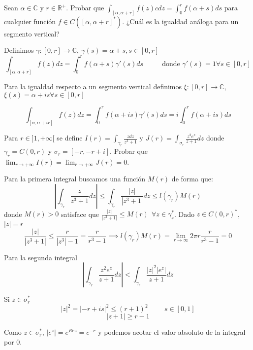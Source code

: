 \begin{ejer}
	Sean $\alpha\in\mathbb{C}$ y $r\in\mathbb{R}^+$. Probar que $\int_{[\alpha,\alpha+r]}f(z)cdz = \int_{0}^{r} f(\alpha +s)ds$ para cualquier función $f\in C([\alpha,\alpha+r]^{\ast})$. ¿Cuál es la igualdad análoga para un segmento vertical?
\end{ejer}

\begin{sol}

Definimos $\gamma :[0,r] \rightarrow \mathbb{C}, \ \gamma (s) = \alpha + s, s\in[0,r]$
$$\int_{[\alpha,\alpha + r]} f(z)dz = \int_{0}^{r} f(\alpha +s)\gamma ' (s)ds \hspace{1cm}\text{ donde }\gamma ' (s) = 1 \forall s\in [0,r]$$

Para la igualdad respecto a un segmento vertical definimos $\xi : [0,r] \rightarrow \mathbb{C}$, $\xi(s) = \alpha +is \forall s\in[0,r]$

$$\int_{[\alpha,\alpha + ir]} f(z)dz = \int_0^r f(\alpha + is) \gamma ' (s)ds = i\int_0^r f(\alpha +is)ds$$

\end{sol}



\begin{ejer}
	Para $r\in]1,+\infty[$ se define $I(r) = \int_{\gamma_r} \frac{zdz}{z^3+1}$ y $J(r) = \int_{\sigma_r} \frac{z^2e^z}{z+1}dz$ donde $\gamma_r=C(0,r)$ y $\sigma_r = [-r,-r+i]$. Probar que $\lim_{r\rightarrow+\infty} I(r) = \lim_{r\rightarrow+\infty} J(r) = 0$.
\end{ejer}

\begin{sol}
Para la primera integral buscamos una función $M(r)$ de forma que:
$$\left| \int_{\gamma_r} \frac{z}{z^3+1}dz \right| \leq \int_{\gamma_r} \frac{|z|}{|z^3+1|} dz \leq l(\gamma_r)M(r)$$
donde $M(r)>0$ satisface que $\frac{|z|}{|z^3+1|} \leq M(r) \ \ \forall z\in\gamma_r^{\ast}$. Dado $z\in C(0,r)^{\ast}$, $|z| = r $
$$\frac{|z|}{|z^3+1|} \leq \frac{r}{|z^3|-1} = \frac{r}{r^3-1} \implies l(\gamma_r)M(r) = \lim_{r\rightarrow\infty} 2\pi r\frac{r}{r^3-1} = 0$$



Para la segunda integral
$$\left| \int_{\gamma_r} \frac{z^2 e^z}{z+1}dz \right| < \int_{\gamma_r} \frac{|z|^2 |e^z|}{z+1}dz$$

Si $z\in\sigma_r^{\ast}$
$$ |z|^2 = |-r+is|^2 \leq (r+1)^2 \hspace{1cm} s\in[0,1] $$
$$ |z+1| \geq r-1 $$

Como $z\in\sigma_r^{\ast}$, $|e^z| = e^{Rez} = e^{-r}$ y podemos acotar el valor absoluto de la integral por $0$.

\end{sol}


